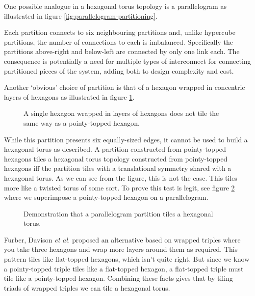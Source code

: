 			One possible analogue in a hexagonal torus topology is a parallelogram as
			illustrated in figure \ref{fig:parallelogram-partitioning}.
			
			Each partition connects to six neighbouring partitions and, unlike
			hypercube partitions, the number of connections to each is imbalanced.
			Specifically the partitions above-right and below-left are connected by
			only one link each. The consequence is potentially a need for multiple
			types of interconnect for connecting partitioned pieces of the system,
			adding both to design complexity and cost.
			
			Another `obvious' choice of partition is that of a hexagon wrapped in
			concentric layers of hexagons as illustrated in figure
			\ref{fig:wrapped-hexagon-tiling}.
			
			\begin{figure}
				\center
				
				
				\caption{A single hexagon wrapped in layers of hexagons does not tile the
				same way as a pointy-topped hexagon.}
				\label{fig:wrapped-hexagon-tiling}
			\end{figure}
			
			While this partition presents six equally-sized edges, it cannot be used
			to build a hexagonal torus as described. A partition constructed from
			pointy-topped hexagons tiles a hexagonal torus topology constructed from
			pointy-topped hexagons iff the partition tiles with a translational
			symmetry shared with a hexagonal torus. As we can see from the figure,
			this is not the case. This tiles more like a twisted torus of some sort.
			To prove this test is legit, see figure \ref{fig:parallelogram-tiling}
			where we superimpose a pointy-topped hexagon on a parallelogram.
			
			\begin{figure}
				\center
				
				
				\caption{Demonstration that a parallelogram partition tiles a hexagonal
				torus.}
				\label{fig:parallelogram-tiling}
			\end{figure}
			
			Furber, Davison \emph{et al.} \cite{davidsonWiring} proposed an
			alternative based on wrapped triples where you take three hexagons and
			wrap more layers around them as required. This pattern tiles like
			flat-topped hexagons, which isn't quite right. But since we know a
			pointy-topped triple tiles like a flat-topped hexagon, a flat-topped
			triple must tile like a pointy-topped hexagon. Combining these facts
			gives that by tiling triads of wrapped triples we can tile a hexagonal
			torus.
			
